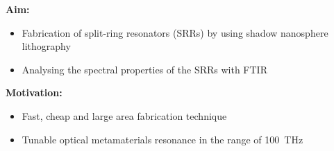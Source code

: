 \textbf{Aim:}
\begin{itemize}
\item{Fabrication of split-ring resonators (SRRs) by using shadow nanosphere lithography}
\item{Analysing the spectral properties of the SRRs with FTIR}
\end{itemize}
\textbf{Motivation:}
\begin{itemize}
\item{Fast, cheap and large area fabrication technique}
\item{Tunable optical metamaterials resonance in the range of \SI{100}{THz}}
\end{itemize}
